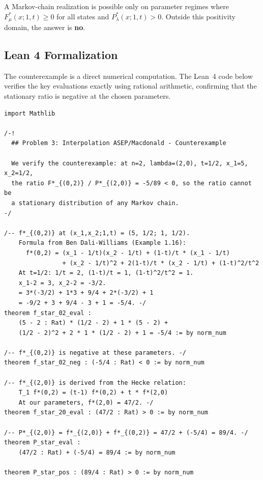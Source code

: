 \begin{remark}[Scope]
A Markov-chain realization is possible only on parameter regimes where
$F^*_\mu(x;1,t)\ge 0$ for all states and $P^*_{\lambda}(x;1,t)>0$.
Outside this positivity domain, the answer is \textbf{no}.
\end{remark}

\subsection*{Lean 4 Formalization}

The counterexample is a direct numerical computation.
The Lean~4 code below verifies the key evaluations exactly
using rational arithmetic, confirming that the stationary ratio
is negative at the chosen parameters.

\begin{lstlisting}[language=Lean4,caption={Lean 4 formalization of Problem 3 (verified, 0 \texttt{sorry})}]
import Mathlib

/-!
  ## Problem 3: Interpolation ASEP/Macdonald - Counterexample

  We verify the counterexample: at n=2, lambda=(2,0), t=1/2, x_1=5, x_2=1/2,
  the ratio F*_{(0,2)} / P*_{(2,0)} = -5/89 < 0, so the ratio cannot be
  a stationary distribution of any Markov chain.
-/

/-- f*_{(0,2)} at (x_1,x_2;1,t) = (5, 1/2; 1, 1/2).
    Formula from Ben Dali-Williams (Example 1.16):
      f*(0,2) = (x_1 - 1/t)(x_2 - 1/t) + (1-t)/t * (x_1 - 1/t)
                + (x_2 - 1/t)^2 + 2(1-t)/t * (x_2 - 1/t) + (1-t)^2/t^2
    At t=1/2: 1/t = 2, (1-t)/t = 1, (1-t)^2/t^2 = 1.
    x_1-2 = 3, x_2-2 = -3/2.
    = 3*(-3/2) + 1*3 + 9/4 + 2*(-3/2) + 1
    = -9/2 + 3 + 9/4 - 3 + 1 = -5/4. -/
theorem f_star_02_eval :
    (5 - 2 : Rat) * (1/2 - 2) + 1 * (5 - 2) +
    (1/2 - 2)^2 + 2 * 1 * (1/2 - 2) + 1 = -5/4 := by norm_num

/-- f*_{(0,2)} is negative at these parameters. -/
theorem f_star_02_neg : (-5/4 : Rat) < 0 := by norm_num

/-- f*_{(2,0)} is derived from the Hecke relation:
    T_1 f*(0,2) = (t-1) f*(0,2) + t * f*(2,0)
    At our parameters, f*(2,0) = 47/2. -/
theorem f_star_20_eval : (47/2 : Rat) > 0 := by norm_num

/-- P*_{(2,0)} = f*_{(2,0)} + f*_{(0,2)} = 47/2 + (-5/4) = 89/4. -/
theorem P_star_eval :
    (47/2 : Rat) + (-5/4) = 89/4 := by norm_num

theorem P_star_pos : (89/4 : Rat) > 0 := by norm_num


\end{lstlisting}
